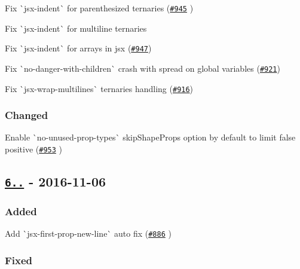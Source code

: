 \begin{DoxyItemize}
\item Fix \`{}jsx-\/indent\`{} for parenthesized ternaries (\href{https://github.com/yannickcr/eslint-plugin-react/issues/945}{\tt \#945} )
\item Fix \`{}jsx-\/indent\`{} for multiline ternaries
\item Fix \`{}jsx-\/indent\`{} for arrays in jsx (\href{https://github.com/yannickcr/eslint-plugin-react/issues/947}{\tt \#947})
\item Fix \`{}no-\/danger-\/with-\/children\`{} crash with spread on global variables (\href{https://github.com/yannickcr/eslint-plugin-react/issues/921}{\tt \#921})
\item Fix \`{}jsx-\/wrap-\/multilines\`{} ternaries handling (\href{https://github.com/yannickcr/eslint-plugin-react/issues/916}{\tt \#916})
\end{DoxyItemize}

\subsubsection*{Changed}


\begin{DoxyItemize}
\item Enable \`{}no-\/unused-\/prop-\/types\`{} {\ttfamily skip\+Shape\+Props} option by default to limit false positive (\href{https://github.com/yannickcr/eslint-plugin-react/pull/953}{\tt \#953} )
\end{DoxyItemize}

\subsection*{\href{https://github.com/yannickcr/eslint-plugin-react/compare/v6.5.0...v6.6.0}{\tt 6..} -\/ 2016-\/11-\/06}

\subsubsection*{Added}


\begin{DoxyItemize}
\item Add \`{}jsx-\/first-\/prop-\/new-\/line\`{} auto fix (\href{https://github.com/yannickcr/eslint-plugin-react/pull/886}{\tt \#886} )
\end{DoxyItemize}

\subsubsection*{Fixed}


